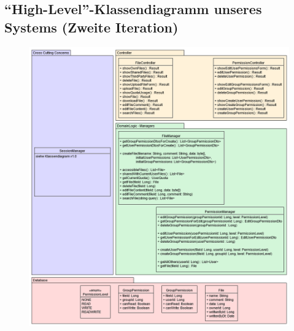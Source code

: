 \documentclass[12pt,DIV14,BCOR10mm,a4paper,parskip=half-,headsepline,headinclude,english,ngerman,bibliography=totocnumbered]{scrreprt}
\begin{document}
\begin{appendices}
\chapter{\enquote{High-Level}-Klassendiagramm unseres Systems (Zweite Iteration)}
\begin{figure}[!htb]
\hspace*{-2.5cm}
	\includegraphics[width=0.93\paperwidth]{resources/class_diagram_2.png}
	\label{architecture:class_diagram2}
\end{figure}


\end{appendices}
\end{document}

